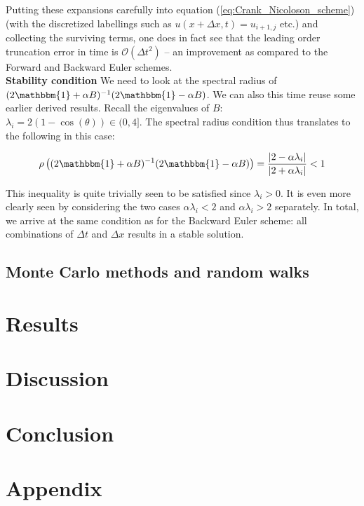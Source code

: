 \documentclass[a4paper, 11pt, notitlepage,english]{article}
\newcommand{\id}{\mathbbm{1}}
\begin{document}
Putting these expansions carefully into equation (\ref{eq:Crank_Nicoloson_scheme}) (with the discretized labellings such as $u(x+\Delta x,t) = u_{i+1,j}$ etc.) and collecting the surviving terms, one does in fact see that the leading order truncation error in time is $\mathcal{O}(\Delta t^2)$ – an improvement as compared to the Forward and Backward Euler schemes. \\

\textbf{Stability condition} \newline
We need to look at the spectral radius of $(2\id + \alpha B)^{-1}(2\id -\alpha B)$. We can also this time reuse some earlier derived results. Recall the eigenvalues of $B$: $\lambda_i = 2(1-\cos(\theta) ) \in (0,4]$. The spectral radius condition thus translates to the following in this case:

\begin{equation}
\rho\left( (2\id + \alpha B)^{-1}(2\id -\alpha B) \right) = \frac{\lvert 2-\alpha \lambda_i\rvert}{\lvert 2+\alpha \lambda_i \rvert} < 1
\label{eq:Crank_Nicolson_spectralrad}
\end{equation}

This inequality is quite trivially seen to be satisfied since $\lambda_i > 0$. It is even more clearly seen by considering the two cases $\alpha\lambda_i < 2$ and $\alpha\lambda_i > 2$ separately. In total, we arrive at the same condition as for the Backward Euler scheme: all combinations of $\Delta t$ and $\Delta x$ results in a stable solution.

\subsection{Monte Carlo methods and random walks}

\section{Results}

\section{Discussion}

\section{Conclusion}

\section{Appendix}
\end{document}
